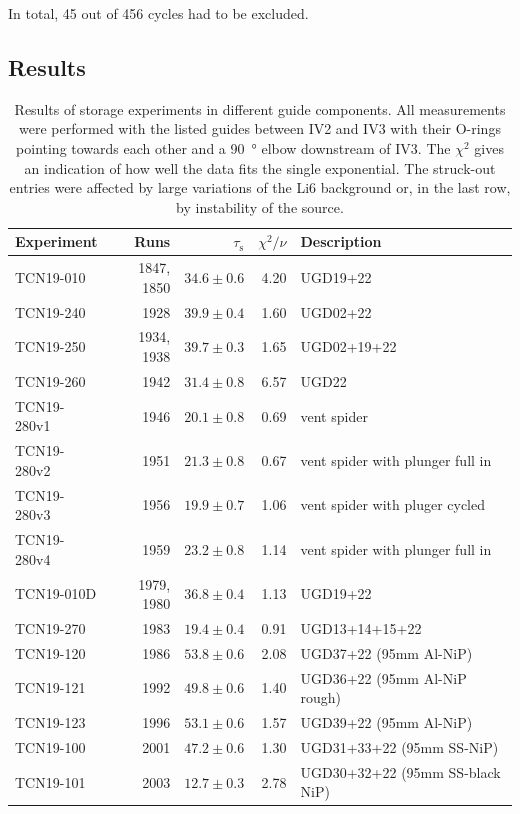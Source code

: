 \documentclass[10pt,letterpaper]{article}
\begin{document}
In total, 45 out of 456 cycles had to be excluded.

\subsection{Results}

\begin{table}
\caption{Results of storage experiments in different guide components. All measurements were performed with the listed guides between IV2 and IV3 with their O-rings pointing towards each other and a \SI{90}{\degree} elbow downstream of IV3. The $\chi^2$ gives an indication of how well the data fits the single exponential. The struck-out entries were affected by large variations of the Li6 background or, in the last row, by instability of the source.}
\begin{tabular}{l r r r l}
\toprule
Experiment & Runs & $\tau_\mathrm{s}$ & $\chi^2/\nu$ & Description \\
\midrule
TCN19-010 & 1847, 1850 & \sout{$34.6 \pm 0.6$} & 4.20 & UGD19+22 \\
TCN19-240 & 1928 & $39.9 \pm 0.4$ & 1.60 & UGD02+22 \\
TCN19-250 & 1934, 1938 & $39.7 \pm 0.3$ & 1.65 & UGD02+19+22 \\
TCN19-260 & 1942 & \sout{$31.4 \pm 0.8$} & 6.57 & UGD22 \\
TCN19-280v1 & 1946 & $20.1 \pm 0.8$ & 0.69 & vent spider \\
TCN19-280v2 & 1951 & $21.3 \pm 0.8$ & 0.67 & vent spider with plunger full in \\
TCN19-280v3 & 1956 & $19.9 \pm 0.7$ & 1.06 & vent spider with pluger cycled \\
TCN19-280v4 & 1959 & $23.2 \pm 0.8$ & 1.14 & vent spider with plunger full in \\
TCN19-010D & 1979, 1980 & $36.8 \pm 0.4$ & 1.13 & UGD19+22 \\
TCN19-270 & 1983 & $19.4 \pm 0.4$ & 0.91 & UGD13+14+15+22 \\
TCN19-120 & 1986 & $53.8 \pm 0.6$ & 2.08 & UGD37+22 (95mm Al-NiP) \\
TCN19-121 & 1992 & $49.8 \pm 0.6$ & 1.40 & UGD36+22 (95mm Al-NiP rough) \\
TCN19-123 & 1996 & $53.1 \pm 0.6$ & 1.57 & UGD39+22 (95mm Al-NiP) \\
TCN19-100 & 2001 & $47.2 \pm 0.6$ & 1.30 & UGD31+33+22 (95mm SS-NiP) \\
TCN19-101 & 2003 & $12.7 \pm 0.3$ & 2.78 & UGD30+32+22 (95mm SS-black NiP) \\

\end{tabular}
\end{table}
\end{document}
